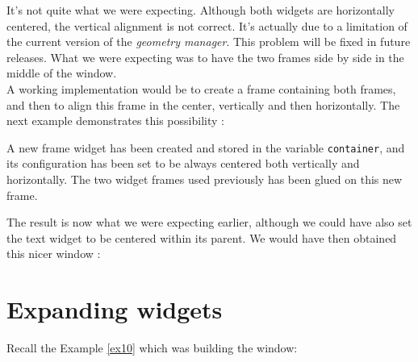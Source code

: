 
It's not quite what we were expecting. Although both widgets are horizontally centered, the vertical alignment is not correct. It's actually due to a limitation of the current version of the {\em geometry manager}. This problem will be fixed in future releases. What we were expecting was to have the two frames side by side in the middle of the window.\\

A working implementation would be to create a frame containing both frames, and then to align this frame in the center, vertically and then horizontally. The next example demonstrates this possibility :


A new frame widget has been created and stored in the variable {\tt container}, and its configuration has been set to be always centered both vertically and horizontally. The two widget frames used previously has been glued on this new frame.


The result is now what we were expecting earlier, although we could have also set the text widget to be centered within its parent. We would have then obtained this nicer window :

\newpage


\section{Expanding widgets}

Recall the Example \ref{ex10} which was building the window:


